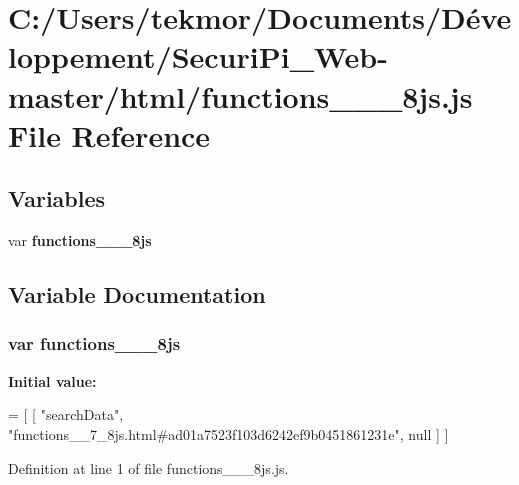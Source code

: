 \section{C\+:/\+Users/tekmor/\+Documents/\+Développement/\+Securi\+Pi\+\_\+\+Web-\/master/html/functions\+\_\+\+\_\+\_\+8js.js File Reference}
\label{functions____7__8js_8js}
\subsection*{Variables}
\begin{DoxyCompactItemize}
\item 
var {\bf functions\+\_\+\+\_\+\_\+8js}
\end{DoxyCompactItemize}


\subsection{Variable Documentation}
\subsubsection[{functions\+\_\+\+\_\+7\+\_\+8js}]{\setlength{\rightskip}{0pt plus 5cm}var functions\+\_\+\+\_\+\_\+8js}\label{functions____7__8js_8js_afda668531008fb0a0185ad96af71caf3}
{\bfseries Initial value\+:}
\begin{DoxyCode}
=
[
    [ \textcolor{stringliteral}{"searchData"}, \textcolor{stringliteral}{"functions\_\_7\_8js.html#ad01a7523f103d6242ef9b0451861231e"}, null ]
]
\end{DoxyCode}


Definition at line 1 of file functions\+\_\+\+\_\+\_\+8js.\+js.

